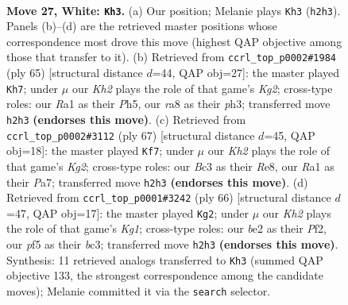\documentclass[11pt]{article}
\begin{document}
\clearpage

\begin{figure}[p]\centering
\begin{subfigure}{0.46\textwidth}\centering
\resizebox{\linewidth}{!}{%
\newchessgame
\chessboard[
  setfen={rn3k2/p7/8/3R1pr1/1P6/2B5/P3bP1K/R7 w - - 2 27},
  showmover=false,
  pgfstyle=straightmove, color=movearrow, markmove={h2-h3}
]}
\caption{}
\end{subfigure}\hfill
\begin{subfigure}{0.46\textwidth}\centering
\resizebox{\linewidth}{!}{%
\newchessgame
\chessboard[
  setfen={4R3/5pk1/8/4P2p/8/7P/r3rP2/5R1K b - - 1 33},
  showmover=false,
  pgfstyle=straightmove, color=movearrow, markmove={g7-h7}
]}
\caption{}
\end{subfigure}
\\[4pt]
\begin{subfigure}{0.46\textwidth}\centering
\resizebox{\linewidth}{!}{%
\newchessgame
\chessboard[
  setfen={3rr3/p3p1k1/8/p2P2R1/1n4N1/8/1P3K2/3R4 b - - 0 34},
  showmover=false,
  pgfstyle=straightmove, color=movearrow, markmove={g7-f7}
]}
\caption{}
\end{subfigure}\hfill
\begin{subfigure}{0.46\textwidth}\centering
\resizebox{\linewidth}{!}{%
\newchessgame
\chessboard[
  setfen={4R3/5p1k/8/p2r2p1/2r1p1P1/2b1B3/P4P2/2R3K1 w - - 0 34},
  showmover=false,
  pgfstyle=straightmove, color=movearrow, markmove={g1-g2}
]}
\caption{}
\end{subfigure}
\caption{\textbf{Move 27, White: \texttt{Kh3}.} (a) Our position; Melanie plays \texttt{Kh3} (\texttt{h2h3}). Panels (b)--(d) are the retrieved master positions whose correspondence most drove this move (highest QAP objective among those that transfer to it). (b) Retrieved from \texttt{ccrl\_top\_p0002\#1984} (ply 65) [structural distance $d$=44, QAP obj=27]: the master played \texttt{Kh7}; under $\mu$ our \emph{Kh2} plays the role of that game's \emph{Kg2}; cross-type roles: our \emph{R}a1 as their \emph{P}h5, our \emph{r}a8 as their \emph{p}h3; transferred move \texttt{h2h3} \textbf{(endorses this move)}. (c) Retrieved from \texttt{ccrl\_top\_p0002\#3112} (ply 67) [structural distance $d$=45, QAP obj=18]: the master played \texttt{Kf7}; under $\mu$ our \emph{Kh2} plays the role of that game's \emph{Kg2}; cross-type roles: our \emph{B}c3 as their \emph{R}e8, our \emph{R}a1 as their \emph{P}a7; transferred move \texttt{h2h3} \textbf{(endorses this move)}. (d) Retrieved from \texttt{ccrl\_top\_p0001\#3242} (ply 66) [structural distance $d$=47, QAP obj=17]: the master played \texttt{Kg2}; under $\mu$ our \emph{Kh2} plays the role of that game's \emph{Kg1}; cross-type roles: our \emph{b}e2 as their \emph{P}f2, our \emph{p}f5 as their \emph{b}c3; transferred move \texttt{h2h3} \textbf{(endorses this move)}. Synthesis: 11 retrieved analogs transferred to \texttt{Kh3} (summed QAP objective 133, the strongest correspondence among the candidate moves); Melanie committed it via the \texttt{search} selector.}
\label{fig:thought-m52}
\end{figure}
\end{document}
